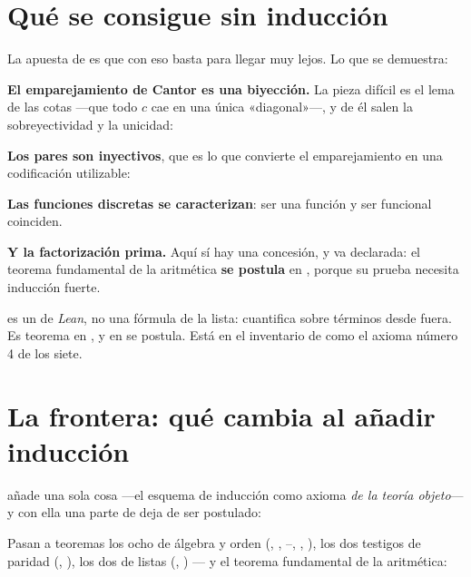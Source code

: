 \section{Qué se consigue sin inducción}

La apuesta de  es que con eso basta para llegar muy lejos. Lo que se demuestra:

\textbf{El emparejamiento de Cantor es una biyección.} La pieza difícil es el lema de las cotas
—que todo \(c\) cae en una única «diagonal»—, y de él salen la sobreyectividad y la unicidad:


\textbf{Los pares son inyectivos}, que es lo que convierte el emparejamiento en una codificación
utilizable:


\textbf{Las funciones discretas se caracterizan}: ser una función y ser funcional coinciden.


\textbf{Y la factorización prima.} Aquí sí hay una concesión, y va declarada: el teorema fundamental
de la aritmética \textbf{se postula} en , porque su prueba necesita inducción fuerte.


\begin{muro}
 es un  de \emph{Lean}, no una fórmula de la lista: cuantifica sobre
términos desde fuera. Es teorema en , y en  se postula. Está en el
inventario de  como el axioma número 4 de los siete.
\end{muro}

\section{La frontera: qué cambia al añadir inducción}

 añade una sola cosa —el esquema de inducción como axioma \emph{de la teoría objeto}— y
con ella una parte de  deja de ser postulado:


Pasan a teoremas los ocho de álgebra y orden (, , --,
, ), los dos testigos de paridad (, ), los dos de
listas (, ) — y el teorema fundamental de la aritmética:

